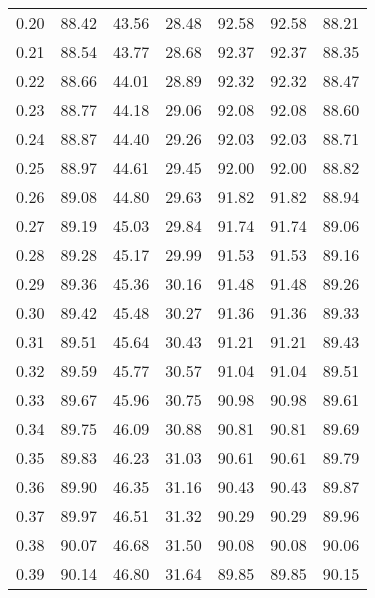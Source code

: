 \begin{tabular}{|c|c|c|c|c|c|c|}
      0.20 &     88.42 &     43.56 &      28.48 &   92.58 &      92.58 &         88.21 \\
      0.21 &     88.54 &     43.77 &      28.68 &   92.37 &      92.37 &         88.35 \\
      0.22 &     88.66 &     44.01 &      28.89 &   92.32 &      92.32 &         88.47 \\
      0.23 &     88.77 &     44.18 &      29.06 &   92.08 &      92.08 &         88.60 \\
      0.24 &     88.87 &     44.40 &      29.26 &   92.03 &      92.03 &         88.71 \\
      0.25 &     88.97 &     44.61 &      29.45 &   92.00 &      92.00 &         88.82 \\
      0.26 &     89.08 &     44.80 &      29.63 &   91.82 &      91.82 &         88.94 \\
      0.27 &     89.19 &     45.03 &      29.84 &   91.74 &      91.74 &         89.06 \\
      0.28 &     89.28 &     45.17 &      29.99 &   91.53 &      91.53 &         89.16 \\
      0.29 &     89.36 &     45.36 &      30.16 &   91.48 &      91.48 &         89.26 \\
      0.30 &     89.42 &     45.48 &      30.27 &   91.36 &      91.36 &         89.33 \\
      0.31 &     89.51 &     45.64 &      30.43 &   91.21 &      91.21 &         89.43 \\
      0.32 &     89.59 &     45.77 &      30.57 &   91.04 &      91.04 &         89.51 \\
      0.33 &     89.67 &     45.96 &      30.75 &   90.98 &      90.98 &         89.61 \\
      0.34 &     89.75 &     46.09 &      30.88 &   90.81 &      90.81 &         89.69 \\
      0.35 &     89.83 &     46.23 &      31.03 &   90.61 &      90.61 &         89.79 \\
      0.36 &     89.90 &     46.35 &      31.16 &   90.43 &      90.43 &         89.87 \\
      0.37 &     89.97 &     46.51 &      31.32 &   90.29 &      90.29 &         89.96 \\
      0.38 &     90.07 &     46.68 &      31.50 &   90.08 &      90.08 &         90.06 \\
      0.39 &     90.14 &     46.80 &      31.64 &   89.85 &      89.85 &         90.15 \\

\end{tabular}
